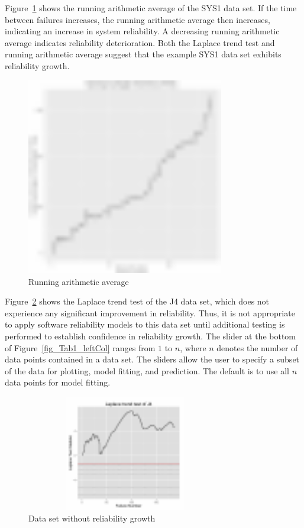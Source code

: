 \documentclass[conference]{IEEEtran}
\begin{document}
Figure~\ref{fig_SRT_RAT} shows the running arithmetic average of the SYS1 data set. If the time between failures increases, the running arithmetic average then increases, indicating an increase in system reliability. A decreasing running arithmetic average indicates reliability deterioration. Both the Laplace trend test and running arithmetic average suggest that the example SYS1 data set exhibits reliability growth.

\begin{figure}[!h]
\centering
\includegraphics[width=3.4in]{Figures/SRT_RAT}
\caption{Running arithmetic average}
\label{fig_SRT_RAT}
\end{figure}


Figure~\ref{fig:J4Trend} shows the Laplace trend test of the J4 data set, which does not experience any significant improvement in reliability. Thus, it is not appropriate to apply software reliability models to this data set until additional testing is performed to establish confidence in reliability growth. The slider at the bottom of Figure~\ref{fig_Tab1_leftCol} ranges from $1$ to $n$, where $n$ denotes the number of data points contained in a data set. The sliders allow the user to specify a subset of the data for plotting, model fitting, and prediction. The default is to use all $n$ data points for model fitting.

\begin{figure}[!h]
\centering
\includegraphics[width=3.4in,height=2in]{Figures/J4_Trend_LP}
\caption{Data set without reliability growth}
\label{fig:J4Trend}
\end{figure}
\end{document}

